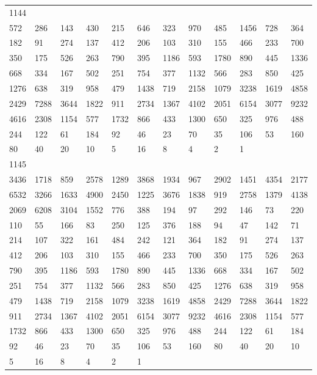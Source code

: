 \begin{longtable}{llllllllllll}
1144&&&&&&&&&&&\\
572& 286& 143& 430& 215& 646& 323& 970& 485& 1456& 728& 364\\
182& 91& 274& 137& 412& 206& 103& 310& 155& 466& 233& 700\\
350& 175& 526& 263& 790& 395& 1186& 593& 1780& 890& 445& 1336\\
668& 334& 167& 502& 251& 754& 377& 1132& 566& 283& 850& 425\\
1276& 638& 319& 958& 479& 1438& 719& 2158& 1079& 3238& 1619& 4858\\
2429& 7288& 3644& 1822& 911& 2734& 1367& 4102& 2051& 6154& 3077& 9232\\
4616& 2308& 1154& 577& 1732& 866& 433& 1300& 650& 325& 976& 488\\
244& 122& 61& 184& 92& 46& 23& 70& 35& 106& 53& 160\\
80& 40& 20& 10& 5& 16& 8& 4& 2& 1& \\

1145&&&&&&&&&&&\\
3436& 1718& 859& 2578& 1289& 3868& 1934& 967& 2902& 1451& 4354& 2177\\
6532& 3266& 1633& 4900& 2450& 1225& 3676& 1838& 919& 2758& 1379& 4138\\
2069& 6208& 3104& 1552& 776& 388& 194& 97& 292& 146& 73& 220\\
110& 55& 166& 83& 250& 125& 376& 188& 94& 47& 142& 71\\
214& 107& 322& 161& 484& 242& 121& 364& 182& 91& 274& 137\\
412& 206& 103& 310& 155& 466& 233& 700& 350& 175& 526& 263\\
790& 395& 1186& 593& 1780& 890& 445& 1336& 668& 334& 167& 502\\
251& 754& 377& 1132& 566& 283& 850& 425& 1276& 638& 319& 958\\
479& 1438& 719& 2158& 1079& 3238& 1619& 4858& 2429& 7288& 3644& 1822\\
911& 2734& 1367& 4102& 2051& 6154& 3077& 9232& 4616& 2308& 1154& 577\\
1732& 866& 433& 1300& 650& 325& 976& 488& 244& 122& 61& 184\\
92& 46& 23& 70& 35& 106& 53& 160& 80& 40& 20& 10\\
5& 16& 8& 4& 2& 1& \\


\end{longtable}
